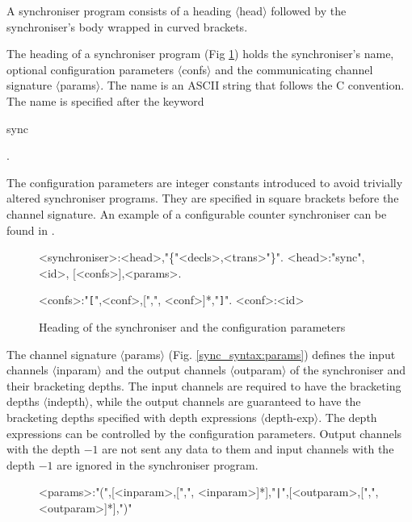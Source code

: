 A synchroniser program consists of a heading $\langle$head$\rangle$ followed by the synchroniser's body wrapped in curved brackets.

The heading of a synchroniser program (Fig \ref{sync_syntax:head}) holds the synchroniser's name, optional configuration parameters $\langle$confs$\rangle$ and the communicating channel signature $\langle$params$\rangle$. The name is an ASCII string that follows the C convention. The name is specified after the keyword \begin{bf}sync\end{bf}.

The configuration parameters are integer constants introduced to avoid trivially altered synchroniser programs. They are specified in square brackets before the channel signature. An example of a configurable counter synchroniser can be found in \cite{astrakahn}.

\begin{figure}[h!]
\small
\begin{grammar}
<synchroniser>:<head>,"\{"<decls>,<trans>"\}".
<head>:"sync", <id>, [<confs>],<params>.

<confs>:"{\tt [}",<conf>,[",", <conf>]*,"{\tt ]}".
<conf>:<id>
\end{grammar}
\caption{Heading of the synchroniser and the configuration parameters}
\label{sync_syntax:head}
\end{figure}

The channel signature $\langle$params$\rangle$ (Fig. \ref{sync_syntax:params}) defines the input channels $\langle$inparam$\rangle$ and the output channels $\langle$outparam$\rangle$ of the synchroniser and their bracketing depths. The input channels are required to have the bracketing depths $\langle$indepth$\rangle$, while the output channels are guaranteed to have the bracketing depths specified with depth expressions $\langle$depth-exp$\rangle$. The depth expressions can be controlled by the configuration parameters. Output channels with the depth $-1$ are not sent any data to them and input channels with the depth $-1$ are ignored in the synchroniser program.

\begin{figure}[h!]
\small
\begin{grammar}
<params>:"(",[<inparam>,[",", <inparam>]*],"{\tt |}",[<outparam>,[",", <outparam>]*],")"
\end{grammar}
\end{figure}

